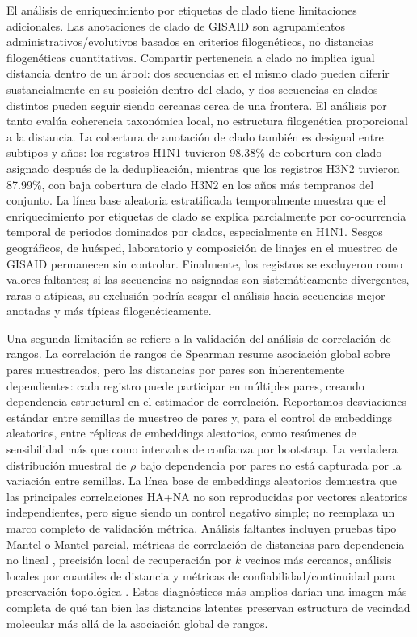 \documentclass[11pt]{article}
\begin{document}
El análisis de enriquecimiento por etiquetas de clado tiene limitaciones adicionales. Las anotaciones de clado de GISAID son agrupamientos administrativos/evolutivos basados en criterios filogenéticos, no distancias filogenéticas cuantitativas. Compartir pertenencia a clado no implica igual distancia dentro de un árbol: dos secuencias en el mismo clado pueden diferir sustancialmente en su posición dentro del clado, y dos secuencias en clados distintos pueden seguir siendo cercanas cerca de una frontera. El análisis por tanto evalúa coherencia taxonómica local, no estructura filogenética proporcional a la distancia. La cobertura de anotación de clado también es desigual entre subtipos y años: los registros H1N1 tuvieron 98.38\% de cobertura con clado asignado después de la deduplicación, mientras que los registros H3N2 tuvieron 87.99\%, con baja cobertura de clado H3N2 en los años más tempranos del conjunto. La línea base aleatoria estratificada temporalmente muestra que el enriquecimiento por etiquetas de clado se explica parcialmente por co-ocurrencia temporal de periodos dominados por clados, especialmente en H1N1. Sesgos geográficos, de huésped, laboratorio y composición de linajes en el muestreo de GISAID permanecen sin controlar. Finalmente, los registros  se excluyeron como valores faltantes; si las secuencias no asignadas son sistemáticamente divergentes, raras o atípicas, su exclusión podría sesgar el análisis hacia secuencias mejor anotadas y más típicas filogenéticamente.

Una segunda limitación se refiere a la validación del análisis de correlación de rangos. La correlación de rangos de Spearman resume asociación global sobre pares muestreados, pero las distancias por pares son inherentemente dependientes: cada registro puede participar en múltiples pares, creando dependencia estructural en el estimador de correlación. Reportamos desviaciones estándar entre semillas de muestreo de pares y, para el control de embeddings aleatorios, entre réplicas de embeddings aleatorios, como resúmenes de sensibilidad más que como intervalos de confianza por bootstrap. La verdadera distribución muestral de $\rho$ bajo dependencia por pares no está capturada por la variación entre semillas. La línea base de embeddings aleatorios demuestra que las principales correlaciones HA+NA no son reproducidas por vectores aleatorios independientes, pero sigue siendo un control negativo simple; no reemplaza un marco completo de validación métrica. Análisis faltantes incluyen pruebas tipo Mantel o Mantel parcial, métricas de correlación de distancias para dependencia no lineal \cite{szekely2007distance}, precisión local de recuperación por $k$ vecinos más cercanos, análisis locales por cuantiles de distancia y métricas de confiabilidad/continuidad para preservación topológica \cite{lee2009quality}. Estos diagnósticos más amplios darían una imagen más completa de qué tan bien las distancias latentes preservan estructura de vecindad molecular más allá de la asociación global de rangos.
\end{document}
